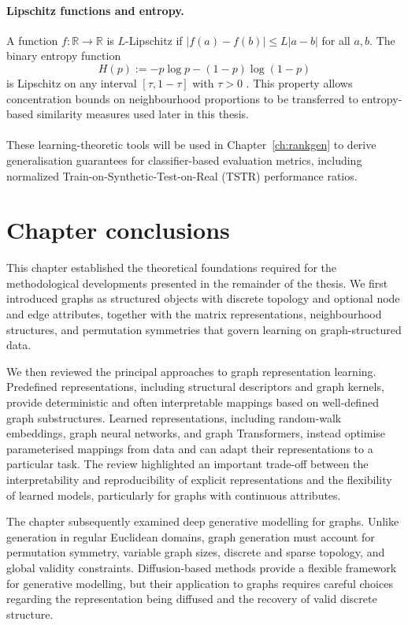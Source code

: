 \paragraph{Lipschitz functions and entropy.}
A function $f:\mathbb{R}\to\mathbb{R}$ is $L$-Lipschitz if
$|f(a)-f(b)|\le L|a-b|$ for all $a,b$.
The binary entropy function
\[
H(p) := -p\log p - (1-p)\log(1-p)
\]
is Lipschitz on any interval $[\tau,1-\tau]$ with $\tau>0$
\citep{cover2006elements}.
This property allows concentration bounds on neighbourhood proportions to be
transferred to entropy-based similarity measures used later in this thesis.
\paragraph{}
These learning-theoretic tools will be used in Chapter~\ref{ch:rankgen}
to derive generalisation guarantees for classifier-based evaluation metrics,
including normalized Train-on-Synthetic-Test-on-Real (TSTR) performance ratios.
\section{Chapter conclusions}
\label{sec:related:conclusions}

This chapter established the theoretical foundations required for the
methodological developments presented in the remainder of the thesis. We first
introduced graphs as structured objects with discrete topology and optional
node and edge attributes, together with the matrix representations,
neighbourhood structures, and permutation symmetries that govern learning on
graph-structured data.

We then reviewed the principal approaches to graph representation learning.
Predefined representations, including structural descriptors and graph
kernels, provide deterministic and often interpretable mappings based on
well-defined graph substructures. Learned representations, including
random-walk embeddings, graph neural networks, and graph Transformers, instead
optimise parameterised mappings from data and can adapt their representations
to a particular task. The review highlighted an important trade-off between
the interpretability and reproducibility of explicit representations and the
flexibility of learned models, particularly for graphs with continuous
attributes.

The chapter subsequently examined deep generative modelling for graphs. Unlike
generation in regular Euclidean domains, graph generation must account for
permutation symmetry, variable graph sizes, discrete and sparse topology, and
global validity constraints. Diffusion-based methods provide a flexible
framework for generative modelling, but their application to graphs requires
careful choices regarding the representation being diffused and the recovery
of valid discrete structure.

